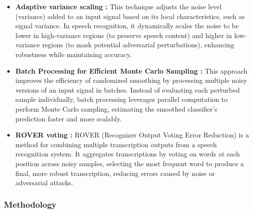 \documentclass[a4paper,12pt]{article}
\begin{document}
\begin{itemize}
    \item \textbf{Adaptive variance scaling \cite{li2024adaptive}:} This technique adjusts the noise level (variance) added to an input signal based on its local characteristics, such as signal variance. In speech recognition, it dynamically scales the noise to be lower in high-variance regions (to preserve speech content) and higher in low-variance regions (to mask potential adversarial perturbations), enhancing robustness while maintaining accuracy.
    \item \textbf{Batch Processing for Efficient Monte Carlo Sampling \cite{cohen2019certified}:} This approach improves the efficiency of randomized smoothing by processing multiple noisy versions of an input signal in batches. Instead of evaluating each perturbed sample individually, batch processing leverages parallel computation to perform Monte Carlo sampling, estimating the smoothed classifier's prediction faster and more scalably. 
    \item \textbf{ROVER voting \cite{olivier2022sequential}:} ROVER (Recognizer Output Voting Error Reduction) is a method for combining multiple transcription outputs from a speech recognition system. It aggregates transcriptions by voting on words at each position across noisy samples, selecting the most frequent word to produce a final, more robust transcription, reducing errors caused by noise or adversarial attacks.
\end{itemize}

\newpage
\subsubsection{Methodology}
\end{document}
